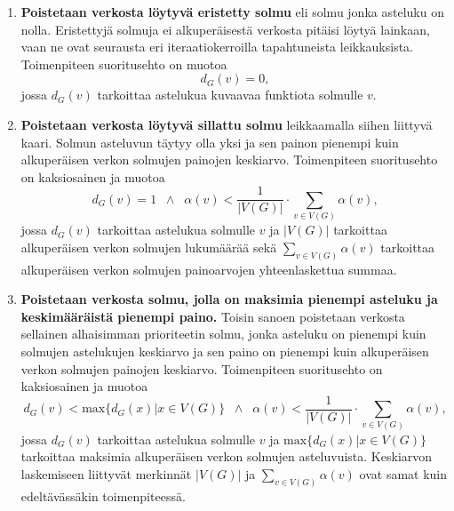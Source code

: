   \begin{enumerate}
    \itemsep1em
    \item \textbf{Poistetaan verkosta löytyvä eristetty solmu} eli solmu jonka asteluku on nolla.
    Eristettyjä solmuja ei alkuperäisestä verkosta pitäisi löytyä lainkaan, vaan ne ovat seurausta eri iteraatiokerroilla tapahtuneista leikkauksista.
    Toimenpiteen suoritusehto on muotoa
      \begin{equation} \label{eq:5_6_2}
        d_G(v) = 0
        \text{,}
      \end{equation}
    jossa \(d_G(v)\) tarkoittaa astelukua  kuvaavaa funktiota solmulle \(v\).
    \item \textbf{Poistetaan verkosta löytyvä sillattu solmu} leikkaamalla siihen liittyvä kaari.
    Solmun asteluvun täytyy olla yksi ja sen painon pienempi kuin alkuperäisen verkon solmujen painojen keskiarvo.
    Toimenpiteen suoritusehto on kaksiosainen ja muotoa
      \begin{equation} \label{eq:5_6_3}
        d_G(v) = 1 \;\; \land \;\; \alpha(v) < \frac{1}{|V(G)|} \cdot \sum\limits_{v \in V(G)} \alpha(v)
        \text{,}
      \end{equation}
    jossa \(d_G(v)\) tarkoittaa astelukua solmulle \(v\) ja \(|V(G)|\) tarkoittaa alkuperäisen verkon solmujen lukumäärää sekä \(\sum\limits_{v \in V(G)} \alpha(v)\) tarkoittaa alkuperäisen verkon solmujen painoarvojen yhteenlaskettua summaa.
    \item \textbf{Poistetaan verkosta solmu, jolla on maksimia pienempi asteluku ja keskimääräistä pienempi paino.}
    Toisin sanoen poistetaan verkosta sellainen alhaisimman prioriteetin solmu, jonka asteluku on pienempi kuin solmujen astelukujen keskiarvo ja sen paino on pienempi kuin alkuperäisen verkon solmujen painojen keskiarvo.
    Toimenpiteen suoritusehto on kaksiosainen ja muotoa
      \begin{equation} \label{eq:5_6_4}
        d_G(v) < \text{max}\{d_G(x) | x \in V(G)\} \;\; \land \;\; \alpha(v) < \frac{1}{|V(G)|} \cdot \sum\limits_{v \in V(G)} \alpha(v)
        \text{,}
      \end{equation}
    jossa \(d_G(v)\) tarkoittaa astelukua solmulle \(v\) ja \( \text{max}\{d_G(x) | x \in V(G)\}\) tarkoittaa maksimia alkuperäisen verkon solmujen asteluvuista.
    Keskiarvon laskemiseen liittyvät merkinnät \(|V(G)|\) ja \(\sum\limits_{v \in V(G)} \alpha(v)\) ovat samat kuin edeltävässäkin toimenpiteessä.
  \end{enumerate}

